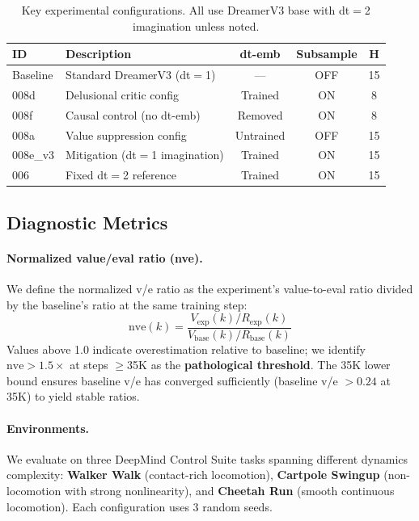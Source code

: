 \documentclass[letterpaper]{article}
\begin{document}
\begin{table}[t]
\centering
\caption{Key experimental configurations. All use DreamerV3 base with dt$=$2 imagination unless noted.}
\label{tab:configs}
\small
\begin{tabular}{llccc}
\toprule
\textbf{ID} & \textbf{Description} & \textbf{dt-emb} & \textbf{Subsample} & \textbf{H} \\
\midrule
Baseline & Standard DreamerV3 (dt$=$1) & --- & OFF & 15 \\
008d & Delusional critic config & Trained & ON & 8 \\
008f & Causal control (no dt-emb) & Removed & ON & 8 \\
008a & Value suppression config & Untrained & OFF & 15 \\
008e\_v3 & Mitigation (dt$=$1 imagination) & Trained & ON & 15 \\
006 & Fixed dt$=$2 reference & Trained & ON & 15 \\
\bottomrule
\end{tabular}
\end{table}

\subsection{Diagnostic Metrics}

\paragraph{Normalized value/eval ratio (nve).}
We define the normalized v/e ratio as the experiment's value-to-eval ratio divided by the baseline's ratio at the same training step:
\begin{equation}
    \text{nve}(k) = \frac{V_{\text{exp}}(k) / R_{\text{exp}}(k)}{V_{\text{base}}(k) / R_{\text{base}}(k)}
\end{equation}
Values above 1.0 indicate overestimation relative to baseline; we identify $\text{nve} > 1.5\times$ at steps $\geq$35K as the \textbf{pathological threshold}.
The 35K lower bound ensures baseline v/e has converged sufficiently (baseline v/e $>0.24$ at 35K) to yield stable ratios.

\paragraph{Environments.}
We evaluate on three DeepMind Control Suite tasks spanning different dynamics complexity:
\textbf{Walker Walk} (contact-rich locomotion), \textbf{Cartpole Swingup} (non-locomotion with strong nonlinearity), and \textbf{Cheetah Run} (smooth continuous locomotion).
Each configuration uses 3 random seeds.
\end{document}

